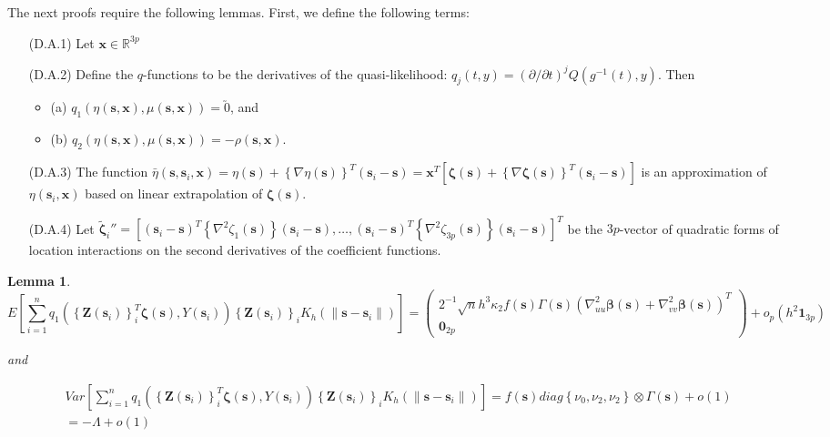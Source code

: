 \documentclass[authoryear,review, 12pt]{elsarticle}
\newtheorem{lem}{Lemma}
\begin{document}
The next proofs require the following lemmas. First, we define the
following terms:
\begin{itemize}
\item[(D.A.1)] Let $\bm{x}\in\mathbb{R}^{3p}$
\item[(D.A.2)] Define the $q$-functions to be the derivatives of the quasi-likelihood:
$q_{j}(t,y)=\left(\partial/\partial t\right)^{j}Q\left(g^{-1}\left(t\right),y\right)$.
Then

\begin{itemize}
\item (a) $q_{1}\left(\eta\left(\bm{s},\bm{x}\right),\mu\left(\bm{s},\bm{x}\right)\right)=\utilde{0}$,
and 
\item (b) $q_{2}\left(\eta\left(\bm{s},\bm{x}\right),\mu\left(\bm{s},\bm{x}\right)\right)=-\rho\left(\bm{s},\bm{x}\right)$.
\end{itemize}
\item[(D.A.3)] The function $\bar{\eta}\left(\bm{s},\bm{s}_{i},\bm{x}\right)=\eta\left(\bm{s}\right)+\left\{ \nabla\eta\left(\bm{s}\right)\right\} ^{T}\left(\bm{s}_{i}-\bm{s}\right)=\bm{x}^{T}\left[\bm{\zeta}\left(\bm{s}\right)+\left\{ \nabla\bm{\zeta}\left(\bm{s}\right)\right\} ^{T}\left(\bm{s}_{i}-\bm{s}\right)\right]$
is an approximation of $\eta\left(\bm{s}_{i},\bm{x}\right)$ based
on linear extrapolation of $\bm{\zeta}\left(\bm{s}\right)$.
\item[(D.A.4)] Let $\tilde{\bm{\zeta}}_{i}''=\left[\left(\bm{s}_{i}-\bm{s}\right)^{T}\left\{ \nabla^{2}\zeta_{1}\left(\bm{s}\right)\right\} \left(\bm{s}_{i}-\bm{s}\right),\dots,\left(\bm{s}_{i}-\bm{s}\right)^{T}\left\{ \nabla^{2}\zeta_{3p}\left(\bm{s}\right)\right\} \left(\bm{s}_{i}-\bm{s}\right)\right]^{T}$
be the $3p$-vector of quadratic forms of location interactions on
the second derivatives of the coefficient functions.\end{itemize}
\begin{lem}
\label{lemma:omega}
\[
E\left[\sum_{i=1}^{n}q_{1}\left(\left\{ \bm{Z}\left(\bm{s}_{i}\right)\right\} _{i}^{T}\bm{\zeta}\left(\bm{s}\right),Y\left(\bm{s}_{i}\right)\right)\left\{ \bm{Z}\left(\bm{s}_{i}\right)\right\} _{i}K_{h}\left(\|\bm{s}-\bm{s}_{i}\|\right)\right]=\left(\begin{array}{c}
2^{-1}\sqrt{n}h^{3}\kappa_{2}f\left(\bm{s}\right)\Gamma\left(\bm{s}\right)\left(\nabla_{uu}^{2}\bm{\beta}\left(\bm{s}\right)+\nabla_{vv}^{2}\bm{\beta}\left(\bm{s}\right)\right)^{T}\\
\bm{0}_{2p}
\end{array}\right)+o_{p}\left(h^{2}\bm{1}_{3p}\right)
\]


and 

\begin{multline*}
Var\left[\sum_{i=1}^{n}q_{1}\left(\left\{ \bm{Z}\left(\bm{s}_{i}\right)\right\} _{i}^{T}\bm{\zeta}\left(\bm{s}\right),Y\left(\bm{s}_{i}\right)\right)\left\{ \bm{Z}\left(\bm{s}_{i}\right)\right\} _{i}K_{h}\left(\|\bm{s}-\bm{s}_{i}\|\right)\right]=f\left(\bm{s}\right)diag\left\{ \nu_{0},\nu_{2},\nu_{2}\right\} \otimes\Gamma\left(\bm{s}\right)+o\left(1\right)\\
=-\Lambda+o\left(1\right)
\end{multline*}

\end{lem}
\end{document}
